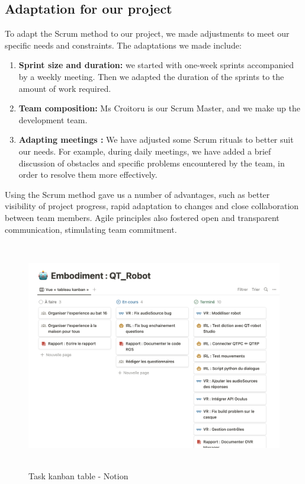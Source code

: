 \subsection{Adaptation for our project}
To adapt the Scrum method to our project, we made adjustments to meet our specific needs and constraints. The adaptations we made include:\\
\begin{enumerate}

\item \textbf{Sprint size and duration:} we started with one-week sprints accompanied by a weekly meeting. Then we adapted the duration of the sprints to the amount of work required.

\item \textbf{Team composition:} Ms Croitoru is our Scrum Master, and we make up the development team.
\item \textbf{Adapting meetings :} We have adjusted some Scrum rituals to better suit our needs. For example, during daily meetings, we have added a brief discussion of obstacles and specific problems encountered by the team, in order to resolve them more effectively.\\
\end{enumerate}
Using the Scrum method gave us a number of advantages, such as better visibility of project progress, rapid adaptation to changes and close collaboration between team members. Agile principles also fostered open and transparent communication, stimulating team commitment.\\

\begin{figure}[!h]
\centering
\includegraphics[height=10cm]{Figures/kanban.png}
\caption{Task kanban table - Notion}
\end{figure}

